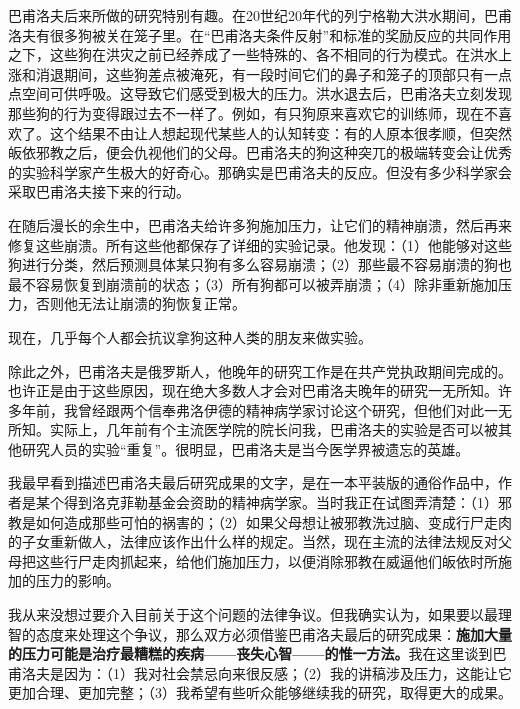 巴甫洛夫后来所做的研究特别有趣。在20世纪20年代的列宁格勒大洪水期间，巴甫洛夫有很多狗被关在笼子里。在“巴甫洛夫条件反射”和标准的奖励反应的共同作用之下，这些狗在洪灾之前已经养成了一些特殊的、各不相同的行为模式。在洪水上涨和消退期间，这些狗差点被淹死，有一段时间它们的鼻子和笼子的顶部只有一点点空间可供呼吸。这导致它们感受到极大的压力。洪水退去后，巴甫洛夫立刻发现那些狗的行为变得跟过去不一样了。例如，有只狗原来喜欢它的训练师，现在不喜欢了。这个结果不由让人想起现代某些人的认知转变：有的人原本很孝顺，但突然皈依邪教之后，便会仇视他们的父母。巴甫洛夫的狗这种突兀的极端转变会让优秀的实验科学家产生极大的好奇心。那确实是巴甫洛夫的反应。但没有多少科学家会采取巴甫洛夫接下来的行动。
\par

在随后漫长的余生中，巴甫洛夫给许多狗施加压力，让它们的精神崩溃，然后再来修复这些崩溃。所有这些他都保存了详细的实验记录。他发现：（1）他能够对这些狗进行分类，然后预测具体某只狗有多么容易崩溃；（2）那些最不容易崩溃的狗也最不容易恢复到崩溃前的状态；（3）所有狗都可以被弄崩溃；（4）除非重新施加压力，否则他无法让崩溃的狗恢复正常。
\par

现在，几乎每个人都会抗议拿狗这种人类的朋友来做实验。
\par

除此之外，巴甫洛夫是俄罗斯人，他晚年的研究工作是在共产党执政期间完成的。也许正是由于这些原因，现在绝大多数人才会对巴甫洛夫晚年的研究一无所知。许多年前，我曾经跟两个信奉弗洛伊德的精神病学家讨论这个研究，但他们对此一无所知。实际上，几年前有个主流医学院的院长问我，巴甫洛夫的实验是否可以被其他研究人员的实验“重复”。很明显，巴甫洛夫是当今医学界被遗忘的英雄。
\par

我最早看到描述巴甫洛夫最后研究成果的文字，是在一本平装版的通俗作品中，作者是某个得到洛克菲勒基金会资助的精神病学家。当时我正在试图弄清楚：（1）邪教是如何造成那些可怕的祸害的；（2）如果父母想让被邪教洗过脑、变成行尸走肉的子女重新做人，法律应该作出什么样的规定。当然，现在主流的法律法规反对父母把这些行尸走肉抓起来，给他们施加压力，以便消除邪教在威逼他们皈依时所施加的压力的影响。
\par

我从来没想过要介入目前关于这个问题的法律争议。但我确实认为，如果要以最理智的态度来处理这个争议，那么双方必须借鉴巴甫洛夫最后的研究成果：\textbf{施加大量的压力可能是治疗最糟糕的疾病——丧失心智——的惟一方法。}我在这里谈到巴甫洛夫是因为：（1）我对社会禁忌向来很反感；（2）我的讲稿涉及压力，这能让它更加合理、更加完整；（3）我希望有些听众能够继续我的研究，取得更大的成果。
\par


